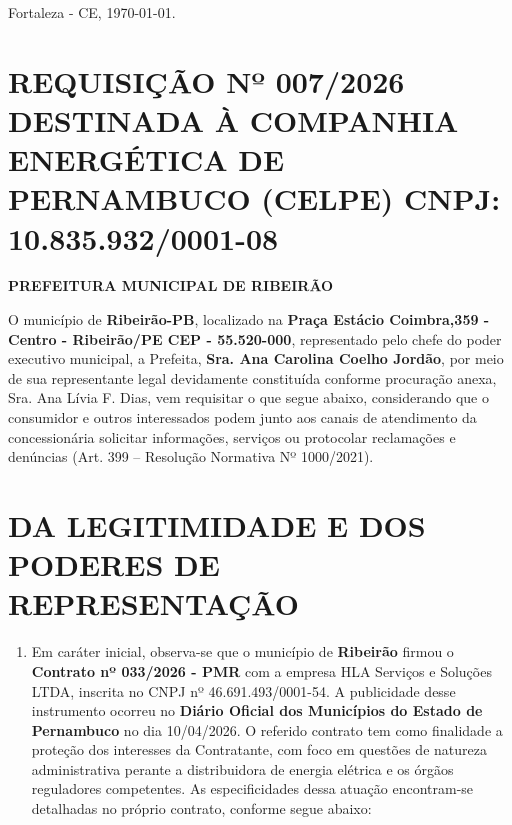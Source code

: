 \documentclass[11pt,a4paper]{article}
\begin{document}
\begin{flushright}
Fortaleza - CE, \today.
\end{flushright}

\section{REQUISIÇÃO Nº 007/2026 DESTINADA À COMPANHIA ENERGÉTICA DE PERNAMBUCO (CELPE) CNPJ: 10.835.932/0001-08}
\vspace{-0.4cm}
\textbf{PREFEITURA MUNICIPAL DE RIBEIRÃO}

\vspace{0.5cm}

O município de \textbf{Ribeirão-PB}, localizado na \textbf{Praça Estácio Coimbra,359 - Centro - Ribeirão/PE CEP - 55.520-000}, representado pelo chefe do poder executivo municipal, a Prefeita, \textbf{Sra. Ana Carolina Coelho Jordão}, por meio de sua representante legal devidamente constituída conforme procuração anexa, Sra. Ana Lívia F. Dias, vem requisitar o que segue abaixo, considerando que o consumidor e outros interessados podem junto aos canais de atendimento da concessionária solicitar informações, serviços ou protocolar reclamações e denúncias (Art. 399 -- Resolução Normativa Nº 1000/2021).

\section{DA LEGITIMIDADE E DOS PODERES DE REPRESENTAÇÃO}

\begin{enumerate}
\item
  Em caráter inicial, observa-se que o município de \textbf{Ribeirão} firmou o \textbf{Contrato nº 033/2026 - PMR} com a empresa HLA Serviços e Soluções LTDA, inscrita no CNPJ nº 46.691.493/0001-54. A publicidade desse instrumento ocorreu no \textbf{Diário Oficial dos Municípios do Estado de Pernambuco} no dia 10/04/2026. O referido contrato tem como finalidade a proteção dos interesses da Contratante, com foco em questões de natureza administrativa perante a distribuidora de energia elétrica e os órgãos reguladores competentes. As especificidades dessa atuação encontram-se detalhadas no próprio contrato, conforme segue abaixo:
\end{enumerate}
\end{document}
